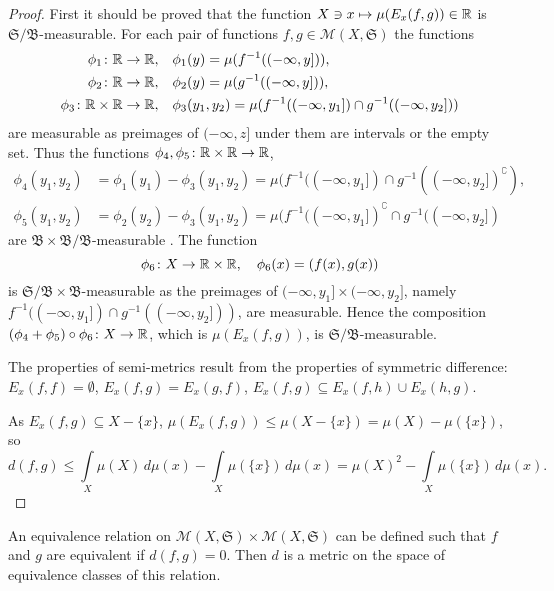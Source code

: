 \begin{proof}
  First it should be proved that the function $X \ni x \mapsto
  \mu(E_x(f, g)) \in \mathbb{R}$ is
  $\mathfrak{S}/\mathfrak{B}$-measurable. For each pair of functions
  $f, g \in \mathcal{M}(X, \mathfrak{S})$ the functions
\begin{align*}
  \phi_1 \colon \mathbb{R} \to \mathbb{R}, & \quad \phi_1(y) = \mu(f^{-1}((-\infty, y])), \\
  \phi_2 \colon \mathbb{R} \to \mathbb{R}, & \quad \phi_2(y) = \mu(g^{-1}((-\infty, y])), \\
  \phi_3 \colon \mathbb{R} \times \mathbb{R} \to \mathbb{R}, & \quad \phi_3(y_1, y_2) = \mu(f^{-1}((-\infty, y_1]) \cap g^{-1}((-\infty, y_2]))
\end{align*}
are measurable as preimages of $(-\infty, z]$ under them are intervals
  or the empty set. Thus the functions $\phi_4, \phi_5 \colon \mathbb{R}
  \times \mathbb{R} \to \mathbb{R}$,
\begin{align*}
  \phi_4(y_1, y_2) &= \phi_1(y_1) - \phi_3(y_1, y_2) = \mu(f^{-1}((-\infty, y_1]) \cap g^{-1}((-\infty, y_2])^\complement), \\
      \phi_5(y_1, y_2) &= \phi_2(y_2) - \phi_3(y_1, y_2) = \mu(f^{-1}((-\infty, y_1])^\complement \cap g^{-1}((-\infty, y_2])
\end{align*}
are $\mathfrak{B} \times \mathfrak{B} / \mathfrak{B}$-measurable \cite
[theorem 13.3, p.~183] {billingsley-2009}.
The function
\[
  \phi_6 \colon X \to \mathbb{R} \times \mathbb{R}, \quad \phi_6(x) = (f(x), g(x))
\]
is $\mathfrak{S}/\mathfrak{B} \times \mathfrak{B}$-measurable as the
preimages of $(-\infty, y_1] \times (-\infty, y_2]$, namely
    $f^{-1}((-\infty, y_1]) \cap g^{-1}((-\infty, y_2]))$, are
        measurable. Hence the composition $(\phi_4 + \phi_5) \circ
        \phi_6 \colon X \to \mathbb{R}$, which is $\mu(E_x(f, g))$, is
        $\mathfrak{S}/\mathfrak{B}$-measurable.

The properties of semi-metrics result from the properties of symmetric
difference: $E_x(f, f) = \emptyset$, $E_x(f, g) = E_x(g, f)$, $E_x(f,
g) \subseteq E_x(f, h) \cup E_x(h, g)$.

As $E_x(f, g) \subseteq X - \{x\}$, $\mu(E_x(f, g)) \leq \mu(X -
\{x\}) = \mu(X) - \mu(\{x\})$, so
\[ d(f, g) \leq \int \limits_X \mu(X) \, d\mu(x) -
\int \limits_X \mu(\{x\}) \, d\mu(x) = \mu(X)^2 - \int \limits_X
\mu(\{x\}) \, d\mu(x). \]
\end{proof}

An equivalence relation on $\mathcal{M}(X, \mathfrak{S}) \times
\mathcal{M}(X, \mathfrak{S})$ can be defined such that $f$ and $g$ are
equivalent if $d(f, g) = 0$. Then $d$ is a metric on the space of
equivalence classes of this relation.


